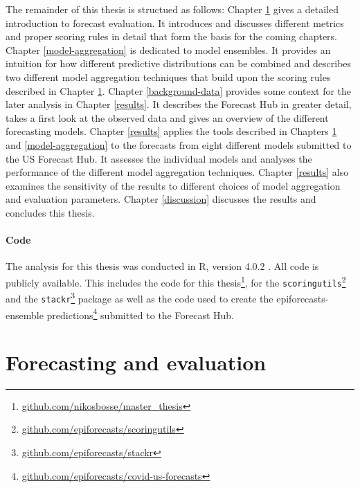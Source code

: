 \documentclass[
]{book}
\begin{document}
The remainder of this thesis is structued as follows: Chapter \ref{evaluation} gives a detailed introduction to forecast evaluation. It introduces and discusses different metrics and proper scoring rules in detail that form the basis for the coming chapters. Chapter \ref{model-aggregation} is dedicated to model ensembles. It provides an intuition for how different predictive distributions can be combined and describes two different model aggregation techniques that build upon the scoring rules described in Chapter \ref{evaluation}. Chapter \ref{background-data} provides some context for the later analysis in Chapter \ref{results}. It describes the Forecast Hub in greater detail, takes a first look at the observed data and gives an overview of the different forecasting models. Chapter \ref{results} applies the tools described in Chapters \ref{evaluation} and \ref{model-aggregation} to the forecasts from eight different models submitted to the US Forecast Hub. It assesses the individual models and analyses the performance of the different model aggregation techniques. Chapter \ref{results} also examines the sensitivity of the results to different choices of model aggregation and evaluation parameters. Chapter \ref{discussion} discusses the results and concludes this thesis.

\hypertarget{code}{%
\subsubsection*{Code}\label{code}}

The analysis for this thesis was conducted in R, version 4.0.2 \citep{R-base}. All code is publicly available. This includes the code for this thesis\footnote{\href{https://github.com/nikosbosse/master_thesis}{github.com/nikosbosse/master\_thesis}}, for the \texttt{scoringutils}\footnote{\href{https://github.com/epiforecasts/scoringutils}{github.com/epiforecasts/scoringutils}} and the \texttt{stackr}\footnote{\href{https://github.com/epiforecasts/stackr}{github.com/epiforecasts/stackr}} package as well as the code used to create the epiforecasts-ensemble predictions\footnote{\href{https://github.com/epiforecasts/covid-us-forecasts}{github.com/epiforecasts/covid-us-forecasts}} submitted to the Forecast Hub.

\hypertarget{evaluation}{%
\chapter{Forecasting and evaluation}\label{evaluation}}
\end{document}
